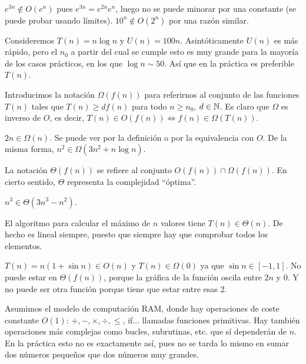 \documentclass[AL.tex]{subfiles}
\begin{document}
\begin{ej}
$e^{3n}\notin O (e^n)$ pues $e^{3n}=e^{2n}e^n$, luego no se puede minorar por una constante (se puede probar usando límites). $10^n\notin O(2^n)$ por una razón similar.
\end{ej}

\begin{ej}
Consideremos $T(n)=n\log n$ y $U(n)=100n$. Asintóticamente $U(n)$ es más rápido, pero el $n_0$ a partir del cual se cumple esto es muy grande para la mayoría de los casos prácticos, en los que $\log n\sim 50$. Así que en la práctica es preferible $T(n)$.
\end{ej}

Introducimos la notación $\Omega(f(n))$ para referirnos al conjunto de las funciones $T(n)$ tales que $T(n)\geq df(n)$ para todo $n\geq n_0$, $d\in\mathbb{N}$. Es claro que $\Omega$ es inverso de $O$, es decir, $T(n)\in O(f(n))\Leftrightarrow f(n)\in\Omega(T(n))$.

\begin{ej}
$2n\in\Omega(n)$. Se puede ver por la definición o por la equivalencia con $O$. De la misma forma, $n^2\in\Omega(3n^2+n\log n)$. 
\end{ej}

La notación $\Theta(f(n))$ se refiere al conjunto $O(f(n))\cap\Omega(f(n))$. En cierto sentido, $\Theta$ representa la complejidad ``óptima''.

\begin{ej}
$n^3\in\Theta(3n^3-n^2)$. 
\end{ej}

\begin{ej}
El algoritmo para calcular el máximo de $n$ valores tiene $T(n)\in\Theta(n)$. De hecho es lineal siempre, puesto que siempre hay que comprobar todos los elementos. 
\end{ej}

\begin{ej}
$T(n)=n(1+\sin n)\in O(n)$ y $T(n)\in\Omega(0)$ ya que $\sin n\in [-1,1]$. No puede estar en $\Theta(f(n))$, porque la gráfica de la función oscila entre $2n$ y 0. Y no puede ser otra función porque tiene que estar entre esas 2. 
\end{ej}

\begin{nota}
Asumimos el modelo de computación RAM, donde hay operaciones de coste constante $O(1)$: $+,-,\times, \div, \leq$, if... llamadas funciones primitivas. Hay también operaciones más complejas como bucles, subrutinas, etc. que sí dependerán de $n$. En la práctica esto no es exactamente así, pues no se tarda lo mismo en sumar dos números pequeños que dos números muy grandes. 
\end{nota}
\end{document}

